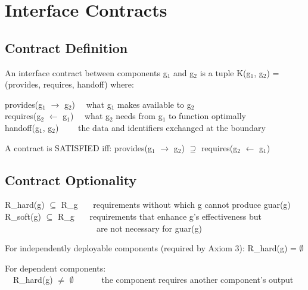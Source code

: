\section{Interface Contracts}
\label{sec:framework-8}


\subsection{Contract Definition}


\begin{cdef}
An interface contract between components g$_1$ and g$_2$ is a tuple K(g$_1$, g$_2$) = (provides, requires, handoff) where:

\begin{claddisp}
provides(g$_1$ $\to$ g$_2$)~~\textemdash{} what g$_1$ makes available to g$_2$\\
requires(g$_2$ $\leftarrow$ g$_1$)~~\textemdash{} what g$_2$ needs from g$_1$ to function optimally\\
handoff(g$_1$, g$_2$)~~~~\textemdash{} the data and identifiers exchanged at the boundary\\
\end{claddisp}
A contract is SATISFIED iff: provides(g$_1$ $\to$ g$_2$) $\supseteq$ requires(g$_2$ $\leftarrow$ g$_1$)

\end{cdef}


\subsection{Contract Optionality}


\begin{cdef}
\begin{cladnote}
R\_hard(g) $\subseteq$ R\_g~~~\textemdash{} requirements without which g cannot produce guar(g)\\
R\_soft(g) $\subseteq$ R\_g~~~\textemdash{} requirements that enhance g's effectiveness but\\
~~~~~~~~~~~~~~~~~~~~~~are not necessary for guar(g)\\
\end{cladnote}
For independently deployable components (required by Axiom 3): R\_\allowbreak{}hard(g) = $\emptyset$

\begin{claddisp}
For dependent components:\\
~~R\_hard(g) $\neq$ $\emptyset$~~~~~~\textemdash{} the component requires another component's output\\
\end{claddisp}
\end{cdef}


